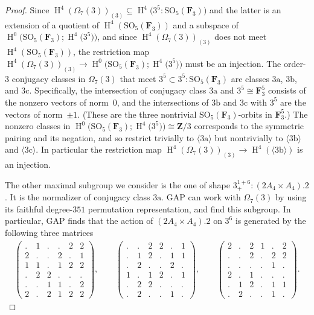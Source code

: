 \documentclass[pdftex]{sigma}
\numberwithin{equation}{section}
\newcommand\bF{\mathbf F}
\newcommand\bZ{\mathbf Z}
\newcommand\ra{\mathrm a}
\newcommand\rb{\mathrm b}
\newcommand\rc{\mathrm c}
\DeclareMathOperator\homology{H}
\renewcommand\H{\homology}
\newcommand\<\langle
\renewcommand\>\rangle
\newcommand\SO{\mathrm{SO}}
\begin{document}
\begin{proof}
 Since $\H^4(\Omega_7(3))_{(3)} \subseteq \H^4\big(3^5:\SO_5(\bF_3)\big)$ and the latter is an extension of a quotient of $\H^4(\SO_5(\bF_3))$ and a subspace of $\H^0\big(\mathrm{SO}_5(\bF_3); \H^4\big(3^5\big)\big)$, and since $\H^4(\Omega_7(3))_{(3)}$ does not meet $\H^4(\SO_5(\bF_3))$, the restriction map $\H^4(\Omega_7(3))_{(3)} \to \H^0\big(\mathrm{SO}_5(\bF_3); \H^4\big(3^5\big)\big)$ must be an injection. The order-$3$ conjugacy classes in $\Omega_7(3)$ that meet $3^5 \subset 3^5: \SO_5(\bF_3)$ are classes $3\ra$, $3\rb$, and $3\rc$. Specifically, the intersection of conjugacy class $3\ra$ and $3^5 \cong \bF_3^5$ consists of the nonzero vectors of norm~$0$, and the intersections of $3\rb$ and $3\rc$ with $3^5$ are the vectors of norm~$\pm 1$. (These are the three nontrivial $\SO_5(\bF_3)$-orbits in $\bF_3^5$.)
 The nonzero classes in $\H^0\big(\mathrm{SO}_5(\bF_3); \H^4\big(3^5\big)\big) \cong \bZ/3$ corresponds to the symmetric pairing and its negation, and so restrict trivially to $\langle 3\ra\rangle$ but nontrivially to $\langle 3\rb\rangle$ and $\langle 3\rc\rangle$. In particular the restriction map $\H^4(\Omega_7(3))_{(3)} \to \H^4(\langle 3\rb\rangle)$ is an injection.

The other maximal subgroup we consider is the one of shape $3^{1+6}_+:(2A_4 \times A_4).2$. It is the normalizer of conjugacy class $3\ra$. GAP can work with $\Omega_7(3)$ by using its faithful degree-$351$ permutation representation, and find this subgroup. In particular, GAP finds that the action of $(2A_4 \times A_4).2$ on $3^6$ is generated by the following three matrices
 \begin{gather*}
 \begin{pmatrix}
 . & 1 & . & . & 2 & 2\\
 2 & . & . & 2 & . & 1\\
 1 & 1 & . & 1 & 2 & 2\\
 . & 2 & 2 & . & . & .\\
 . & . & 1 & 1 & . & 2\\
 2 & . & 2 & 1 & 2 & 2
\end{pmatrix},
 \qquad
\begin{pmatrix}
 . & . & 2 & 2 & . & 1\\
 . & 1 & 2 & . & 1 & 1\\
 . & 2 & . & . & 2 & .\\
 1 & . & 1 & 2 & . & 1\\
 . & 2 & 2 & . & . & .\\
 . & 2 & . & . & 1 & .
\end{pmatrix},
 \qquad
\begin{pmatrix}
 2 & . & 2 & 1 & . & 2\\
 . & . & 2 & . & 2 & 2\\
 . & . & . & . & 1 & .\\
 2 & . & 1 & . & . & .\\
 . & 1 & 2 & . & 1 & 1\\
 . & 2 & . & . & 1 & .
\end{pmatrix}.
 \end{gather*}


\end{proof}
\end{document}
